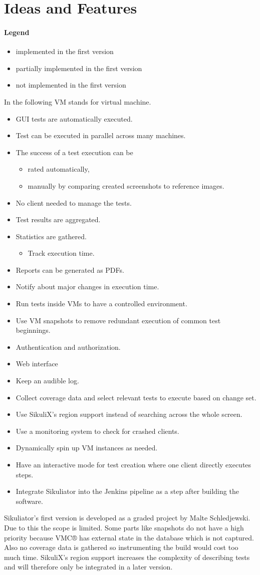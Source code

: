 \documentclass[a4paper,twocolumn]{article}
\newcommand{\VMC}[0]{VMC®}
\newcommand{\Sik}[0]{Sikuliator}
\newcommand{\notImplemented}[0]{\item[$\times$] }
\newcommand{\partiallyImplemented}[0]{\item[$\boxdot$] }
\newcommand{\implemented}[0]{\item[\checkmark] }
\begin{document}
\section{Ideas and Features}
\paragraph{Legend}
\begin{itemize}
	\implemented implemented in the first version
	\partiallyImplemented partially implemented in the first version
	\notImplemented not implemented in the first version
\end{itemize}
	
	In the following VM stands for virtual machine.
\begin{itemize}
	\implemented GUI tests are automatically executed.
	\implemented Test can be executed in parallel across many machines.
	\partiallyImplemented The success of a test execution can be
	\begin{itemize}
		\implemented rated automatically,
		\notImplemented manually by comparing created screenshots to reference images.
	\end{itemize}
	\implemented No client needed to manage the tests.
	\implemented Test results are aggregated.
	\partiallyImplemented Statistics are gathered.
	\begin{itemize}
		\implemented Track execution time.
	\end{itemize}
	\notImplemented Reports can be generated as PDFs.
	\notImplemented Notify about major changes in execution time.
	\implemented Run tests inside VMs to have a controlled environment.
	\notImplemented Use VM snapshots to remove redundant execution of common test beginnings.
	\notImplemented Authentication and authorization.
	\partiallyImplemented Web interface
	\notImplemented Keep an audible log.
	\notImplemented Collect coverage data and select relevant tests to execute based on change set.
	\notImplemented Use SikuliX's region support instead of searching across the whole screen.
	\notImplemented Use a monitoring system to check for crashed clients.
	\notImplemented Dynamically spin up VM instances as needed.
	\notImplemented Have an interactive mode for test creation where one client directly executes steps.
	\notImplemented Integrate \Sik{} into the Jenkins\cite{Jenkins} pipeline as a step after building the software.
\end{itemize}

\Sik{}'s first version is developed as a graded project by Malte Schledjewski.
Due to this the scope is limited.
Some parts like snapshots do not have a high priority because \VMC{} has external state in the database which is not captured. Also no coverage data is gathered so instrumenting the build would cost too much time. 
SikuliX's region support increases the complexity of describing tests and will therefore only be integrated in a later version.
\end{document}
